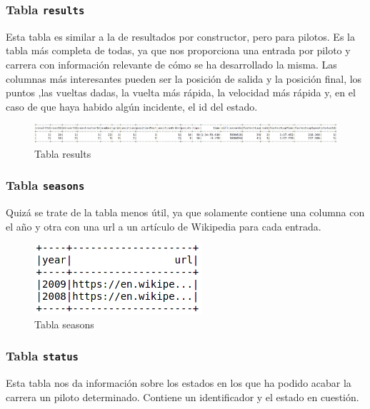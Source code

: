 \documentclass[12pt,twoside,titlepage]{report}
\begin{document}
\subsubsection{Tabla \texttt{results}}

Esta tabla es similar a la de resultados por constructor, pero para pilotos. Es la tabla más completa de todas, ya que nos proporciona una entrada por piloto y carrera con información relevante de cómo se ha desarrollado la misma. Las columnas más interesantes pueden ser la posición de salida y la posición final, los puntos ,las vueltas dadas, la vuelta más rápida, la velocidad más rápida y, en el caso de que haya habido algún incidente, el id del estado. 

\begin{figure}[H]
  \includegraphics[scale=0.27]{results_table.png}
  \centering
  \caption{Tabla results}
  \label{fig:resultstab}
  \centering
\end{figure}

\subsubsection{Tabla \texttt{seasons}}

Quizá se trate de la tabla menos útil, ya que solamente contiene una columna con el año y otra con una url a un artículo de Wikipedia para cada entrada. 

\begin{figure}[H]
  \includegraphics[scale=0.7]{season_table.png}
  \centering
  \caption{Tabla seasons}
  \label{fig:seasonstable}
  \centering
\end{figure}


\subsubsection{Tabla \texttt{status}}

Esta tabla nos da información sobre los estados en los que ha podido acabar la carrera un piloto determinado. Contiene un identificador y el estado en cuestión. 
\end{document}
